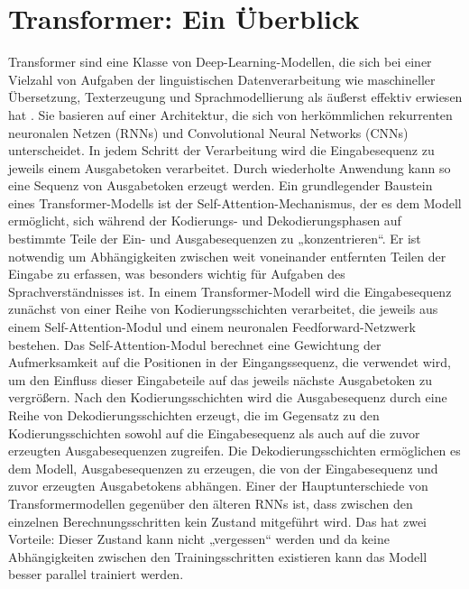 \section{Transformer: Ein Überblick}
\label{subsec:Foundations:Transformer}
Transformer \cite{transformers} sind eine Klasse von Deep-Learning-Modellen, die sich bei einer Vielzahl von Aufgaben der linguistischen Datenverarbeitung wie maschineller Übersetzung, Text\-er\-zeugung und Sprachmodellierung als äußerst effektiv erwiesen hat \cite{transformers,bert,FewShotLearners,gpt4}.
Sie basieren auf einer Architektur, die sich von herkömmlichen rekurrenten neuronalen Netzen (RNNs) und Convolutional Neural Networks (CNNs) unterscheidet.
In jedem Schritt der Verarbeitung wird die Eingabesequenz zu jeweils einem Ausgabetoken verarbeitet.
Durch wiederholte Anwendung kann so eine Sequenz von Ausgabetoken erzeugt werden.
Ein grundlegender Baustein eines Transformer-Modells ist der Self-Attention-Mechanismus, der es dem Modell ermöglicht, sich während der Kodierungs- und Dekodierungsphasen auf bestimmte Teile der Ein- und Ausgabesequenzen zu „konzentrieren“.
Er ist notwendig um Abhängigkeiten zwischen weit voneinander entfernten Teilen der Eingabe zu erfassen, was besonders wichtig für Aufgaben des Sprachverständnisses ist.
In einem Transformer-Modell wird die Eingabesequenz zunächst von einer Reihe von Kodierungsschichten verarbeitet, die jeweils aus einem Self-Attention-Modul und einem neuronalen Feedforward-Netzwerk bestehen.
Das Self-Attention-Modul berechnet eine Gewichtung der Aufmerksamkeit auf die Positionen in der Eingangssequenz, die verwendet wird, um den Einfluss dieser Eingabeteile auf das jeweils nächste Ausgabetoken zu vergrößern.
Nach den Kodierungsschichten wird die Ausgabesequenz durch eine Reihe von Dekodierungsschichten erzeugt, die im Gegensatz zu den Kodierungsschichten sowohl auf die Eingabesequenz als auch auf die zuvor erzeugten Ausgabesequenzen zugreifen.
Die Dekodierungsschichten ermöglichen es dem Modell, Ausgabesequenzen zu erzeugen, die von der Eingabesequenz und zuvor erzeugten Ausgabetokens abhängen.
Einer der Hauptunterschiede von Transformermodellen gegenüber den älteren RNNs ist, dass zwischen den einzelnen Berechnungsschritten kein Zustand mitgeführt wird.
Das hat zwei Vorteile: Dieser Zustand kann nicht „vergessen“ werden und da keine Abhängigkeiten zwischen den Trainingsschritten existieren kann das Modell besser parallel trainiert werden.

